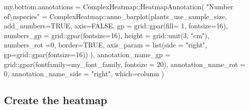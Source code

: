 \documentclass[
]{article}
\newenvironment{Shaded}{\begin{snugshade}}{\end{snugshade}}
\newcommand{\AttributeTok}[1]{\textcolor[rgb]{0.77,0.63,0.00}{#1}}
\newcommand{\ConstantTok}[1]{\textcolor[rgb]{0.00,0.00,0.00}{#1}}
\newcommand{\DecValTok}[1]{\textcolor[rgb]{0.00,0.00,0.81}{#1}}
\newcommand{\FunctionTok}[1]{\textcolor[rgb]{0.00,0.00,0.00}{#1}}
\newcommand{\NormalTok}[1]{#1}
\newcommand{\OtherTok}[1]{\textcolor[rgb]{0.56,0.35,0.01}{#1}}
\newcommand{\SpecialCharTok}[1]{\textcolor[rgb]{0.00,0.00,0.00}{#1}}
\newcommand{\StringTok}[1]{\textcolor[rgb]{0.31,0.60,0.02}{#1}}
\begin{document}
\begin{Shaded}
\begin{Highlighting}[]
\NormalTok{my.bottom.annotations }\OtherTok{=}\NormalTok{ ComplexHeatmap}\SpecialCharTok{::}\FunctionTok{HeatmapAnnotation}\NormalTok{(}
\StringTok{"Number of}\SpecialCharTok{\textbackslash{}n}\StringTok{species"} \OtherTok{=}\NormalTok{ ComplexHeatmap}\SpecialCharTok{::}\FunctionTok{anno\_barplot}\NormalTok{(plants\_use\_sample\_size,}
                                  \AttributeTok{add\_numbers=}\ConstantTok{TRUE}\NormalTok{,}
                                  \AttributeTok{axis=}\ConstantTok{FALSE}\NormalTok{,}
                                  \AttributeTok{gp =}\NormalTok{ grid}\SpecialCharTok{::}\FunctionTok{gpar}\NormalTok{(}\AttributeTok{fill=} \DecValTok{1}\NormalTok{,}
                                                  \AttributeTok{fontsize=}\DecValTok{16}\NormalTok{),}
                                  \AttributeTok{numbers\_gp =}\NormalTok{ grid}\SpecialCharTok{::}\FunctionTok{gpar}\NormalTok{(}\AttributeTok{fontsize=}\DecValTok{16}\NormalTok{),}
                                  \AttributeTok{height =}\NormalTok{ grid}\SpecialCharTok{::}\FunctionTok{unit}\NormalTok{(}\DecValTok{3}\NormalTok{, }\StringTok{"cm"}\NormalTok{),}
                                  \AttributeTok{numbers\_rot =}\DecValTok{0}\NormalTok{,}
                                  \AttributeTok{border=}\ConstantTok{TRUE}\NormalTok{,}
                                  \AttributeTok{axis\_param =} \FunctionTok{list}\NormalTok{(}\AttributeTok{side =} \StringTok{"right"}\NormalTok{,}
                                                    \AttributeTok{gp=}\NormalTok{grid}\SpecialCharTok{::}\FunctionTok{gpar}\NormalTok{(}\AttributeTok{fontsize=}\DecValTok{16}\NormalTok{))}
\NormalTok{                                                    ),}
\AttributeTok{annotation\_name\_gp =}\NormalTok{ grid}\SpecialCharTok{::}\FunctionTok{gpar}\NormalTok{(}\AttributeTok{fontfamily=}\NormalTok{my\_font\_family, }\AttributeTok{fontsize =} \DecValTok{20}\NormalTok{),}
\AttributeTok{annotation\_name\_rot =} \DecValTok{0}\NormalTok{,}
\AttributeTok{annotation\_name\_side =} \StringTok{"right"}\NormalTok{,}
\AttributeTok{which=}\StringTok{\textquotesingle{}column\textquotesingle{}}
\NormalTok{)}
\end{Highlighting}
\end{Shaded}

\hypertarget{create-the-heatmap}{%
\subsection{Create the heatmap}\label{create-the-heatmap}}
\end{document}

